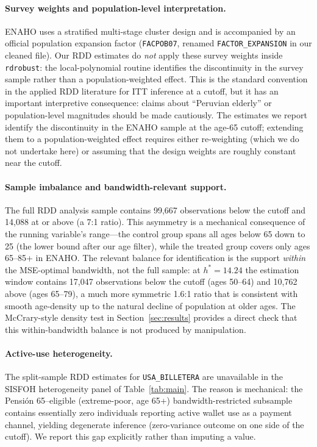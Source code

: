 \documentclass[12pt]{article}
\begin{document}
\paragraph{Survey weights and population-level interpretation.}
ENAHO uses a stratified multi-stage cluster design and is accompanied by an official population expansion factor (\texttt{FACPOB07}, renamed \texttt{FACTOR\_EXPANSION} in our cleaned file). Our RDD estimates do \emph{not} apply these survey weights inside \texttt{rdrobust}: the local-polynomial routine identifies the discontinuity in the survey sample rather than a population-weighted effect. This is the standard convention in the applied RDD literature for ITT inference at a cutoff, but it has an important interpretive consequence: claims about ``Peruvian elderly'' or population-level magnitudes should be made cautiously. The estimates we report identify the discontinuity in the ENAHO sample at the age-65 cutoff; extending them to a population-weighted effect requires either re-weighting (which we do not undertake here) or assuming that the design weights are roughly constant near the cutoff.

\paragraph{Sample imbalance and bandwidth-relevant support.}
The full RDD analysis sample contains 99{,}667 observations below the cutoff and 14{,}088 at or above (a 7:1 ratio). This asymmetry is a mechanical consequence of the running variable's range---the control group spans all ages below 65 down to 25 (the lower bound after our age filter), while the treated group covers only ages 65--85+ in ENAHO. The relevant balance for identification is the support \emph{within} the MSE-optimal bandwidth, not the full sample: at $h^{\ast}\!=\!14.24$ the estimation window contains 17{,}047 observations below the cutoff (ages 50--64) and 10{,}762 above (ages 65--79), a much more symmetric 1.6:1 ratio that is consistent with smooth age-density up to the natural decline of population at older ages. The McCrary-style density test in Section~\ref{sec:results} provides a direct check that this within-bandwidth balance is not produced by manipulation.

\paragraph{Active-use heterogeneity.}
The split-sample RDD estimates for \texttt{USA\_BILLETERA} are unavailable in the SISFOH heterogeneity panel of Table~\ref{tab:main}. The reason is mechanical: the Pensi\'on 65--eligible (extreme-poor, age 65+) bandwidth-restricted subsample contains essentially zero individuals reporting active wallet use as a payment channel, yielding degenerate inference (zero-variance outcome on one side of the cutoff). We report this gap explicitly rather than imputing a value.
\end{document}
